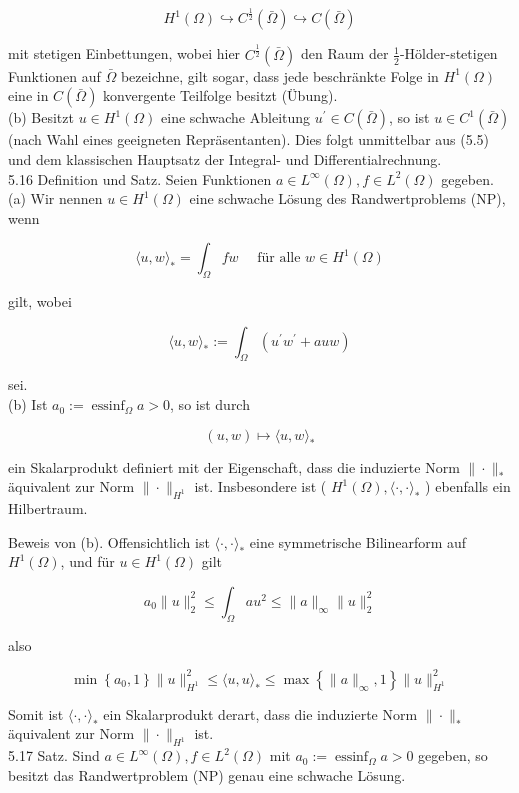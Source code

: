 \documentclass[10pt, letterpaper]{article}
\begin{document}
$$
H^{1}(\Omega) \hookrightarrow C^{\frac{1}{2}}(\bar{\Omega}) \hookrightarrow C(\bar{\Omega})
$$

mit stetigen Einbettungen, wobei hier $C^{\frac{1}{2}}(\bar{\Omega})$ den Raum der $\frac{1}{2}$-Hölder-stetigen Funktionen auf $\bar{\Omega}$ bezeichne, gilt sogar, dass jede beschränkte Folge in $H^{1}(\Omega)$ eine in $C(\bar{\Omega})$ konvergente Teilfolge besitzt (Übung).\\
(b) Besitzt $u \in H^{1}(\Omega)$ eine schwache Ableitung $u^{\prime} \in C(\bar{\Omega})$, so ist $u \in C^{1}(\bar{\Omega})$ (nach Wahl eines geeigneten Repräsentanten). Dies folgt unmittelbar aus (5.5) und dem klassischen Hauptsatz der Integral- und Differentialrechnung.\\
5.16 Definition und Satz. Seien Funktionen $a \in L^{\infty}(\Omega), f \in L^{2}(\Omega)$ gegeben.\\
(a) Wir nennen $u \in H^{1}(\Omega)$ eine schwache Lösung des Randwertproblems (NP), wenn

$$
\langle u, w\rangle_{*}=\int_{\Omega} f w \quad \text { für alle } w \in H^{1}(\Omega)
$$

gilt, wobei

$$
\langle u, w\rangle_{*}:=\int_{\Omega}\left(u^{\prime} w^{\prime}+a u w\right)
$$

sei.\\
(b) Ist $a_{0}:=\operatorname{essinf}_{\Omega} a>0$, so ist durch

$$
(u, w) \mapsto\langle u, w\rangle_{*}
$$

ein Skalarprodukt definiert mit der Eigenschaft, dass die induzierte Norm $\|\cdot\|_{*}$ äquivalent zur Norm $\|\cdot\|_{H^{1}}$ ist. Insbesondere ist ( $H^{1}(\Omega),\langle\cdot, \cdot\rangle_{*}$ ) ebenfalls ein Hilbertraum.

Beweis von (b). Offensichtlich ist $\langle\cdot, \cdot\rangle_{*}$ eine symmetrische Bilinearform auf $H^{1}(\Omega)$, und für $u \in H^{1}(\Omega)$ gilt

$$
a_{0}\|u\|_{2}^{2} \leq \int_{\Omega} a u^{2} \leq\|a\|_{\infty}\|u\|_{2}^{2}
$$

also

$$
\min \left\{a_{0}, 1\right\}\|u\|_{H^{1}}^{2} \leq\langle u, u\rangle_{*} \leq \max \left\{\|a\|_{\infty}, 1\right\}\|u\|_{H^{1}}^{2}
$$

Somit ist $\langle\cdot, \cdot\rangle_{*}$ ein Skalarprodukt derart, dass die induzierte Norm $\|\cdot\|_{*}$ äquivalent zur Norm $\|\cdot\|_{H^{1}}$ ist.\\
5.17 Satz. Sind $a \in L^{\infty}(\Omega), f \in L^{2}(\Omega)$ mit $a_{0}:=\operatorname{essinf}_{\Omega} a>0$ gegeben, so besitzt das Randwertproblem (NP) genau eine schwache Lösung.
\end{document}
